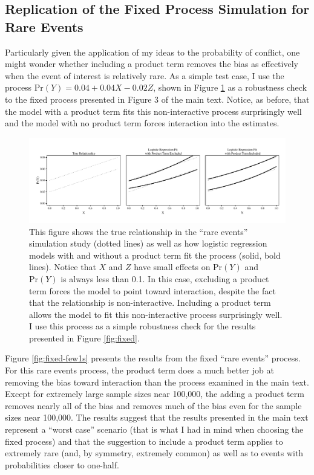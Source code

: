 \documentclass[12pt]{article}
\begin{document}
\begin{appendix}
\section{Replication of the Fixed Process Simulation for Rare Events}

Particularly given the application of my ideas to the probability of conflict, one might wonder whether including a product term removes the bias as effectively when the event of interest is relatively rare. As a simple test case, I use the process $\text{Pr}(Y) = 0.04 + 0.04X - 0.02Z$, shown in Figure \ref{fig:relationships-fits-few1s} as a robustness check to the fixed process presented in Figure 3 of the main text. Notice, as before, that the model with a product term fits this non-interactive process surprisingly well and the model with no product term forces interaction into the estimates.

\begin{figure}[H]
\begin{center}
\includegraphics[width=\linewidth]{fig/fig-example-few1s.pdf}
\end{center}
\caption{This figure shows the true relationship in the ``rare events''  simulation study (dotted lines) as well as how logistic regression models with and without a product term fit the process (solid, bold lines). Notice that $X$ and $Z$ have small effects on $\text{Pr}(Y)$ and $\text{Pr}(Y)$ is always less than 0.1. In this case, excluding a product term forces the model to point toward interaction, despite the fact that the relationship is non-interactive. Including a product term allows the model to fit this non-interactive process surprisingly well. I use this process as a simple robustness check for the results presented in Figure \ref{fig:fixed}.}\label{fig:relationships-fits-few1s}
\end{figure}

Figure \ref{fig:fixed-few1s} presents the results from the fixed ``rare events'' process. For this rare events process, the product term does a much better job at removing the bias toward interaction than the process examined in the main text. Except for extremely large sample sizes near 100,000, the adding a product term removes nearly all of the bias and removes much of the bias even for the sample sizes near 100,000. The results suggest that the results presented in the main text represent a ``worst case'' scenario (that is what I had in mind when choosing the fixed process) and that the suggestion to include a product term applies to extremely rare (and, by symmetry, extremely common) as well as to events with probabilities closer to one-half.  


\end{appendix}
\end{document}
